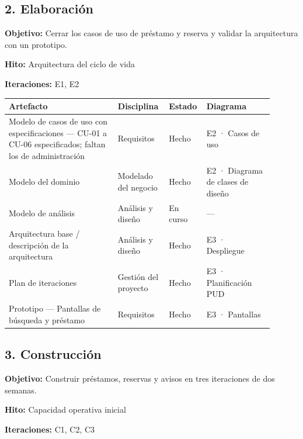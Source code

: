 \documentclass[11pt,a4paper]{article}
\begin{document}
\subsection*{2. Elaboración}

\textbf{Objetivo:} Cerrar los casos de uso de préstamo y reserva y validar la arquitectura con un prototipo.

\textbf{Hito:} Arquitectura del ciclo de vida

\textbf{Iteraciones:} E1, E2

{\small
\begin{longtable}{@{}>{\raggedright\arraybackslash}p{0.396\linewidth}>{\raggedright\arraybackslash}p{0.167\linewidth}>{\raggedright\arraybackslash}p{0.091\linewidth}>{\raggedright\arraybackslash}p{0.244\linewidth}@{}}
\toprule
\textbf{Artefacto} & \textbf{Disciplina} & \textbf{Estado} & \textbf{Diagrama} \\
\midrule
\endhead
Modelo de casos de uso con especificaciones — CU-01 a CU-06 especificados; faltan los de administración & Requisitos & Hecho & E2 · Casos de uso \\
Modelo del dominio & Modelado del negocio & Hecho & E2 · Diagrama de clases de diseño \\
Modelo de análisis & Análisis y diseño & En curso & — \\
Arquitectura base / descripción de la arquitectura & Análisis y diseño & Hecho & E3 · Despliegue \\
Plan de iteraciones & Gestión del proyecto & Hecho & E3 · Planificación PUD \\
Prototipo — Pantallas de búsqueda y préstamo & Requisitos & Hecho & E3 · Pantallas \\
\bottomrule
\end{longtable}}

\subsection*{3. Construcción}

\textbf{Objetivo:} Construir préstamos, reservas y avisos en tres iteraciones de dos semanas.

\textbf{Hito:} Capacidad operativa inicial

\textbf{Iteraciones:} C1, C2, C3
\end{document}
